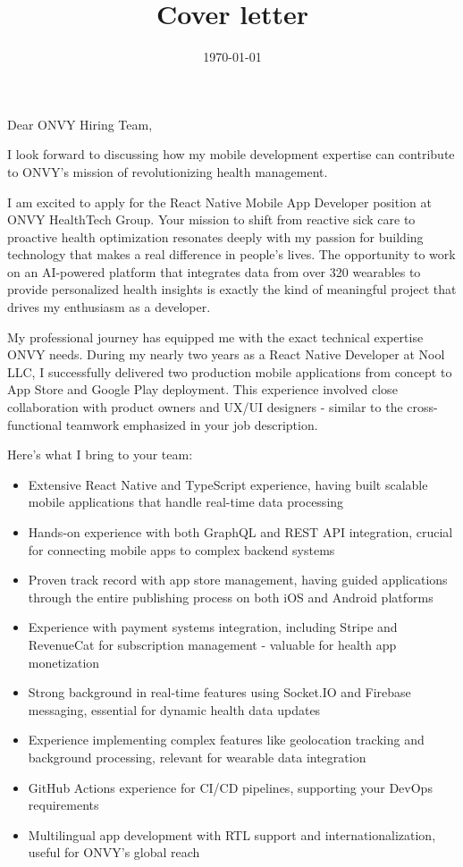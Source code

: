 \documentclass[11pt,a4paper,roman]{moderncv}        %
\title{Cover letter}
\begin{document}
\date{\today}
\opening{Dear ONVY Hiring Team,}
\closing{I look forward to discussing how my mobile development expertise can contribute to ONVY's mission of revolutionizing health management.}

\makelettertitle

I am excited to apply for the React Native Mobile App Developer position at ONVY HealthTech Group. Your mission to shift from reactive sick care to proactive health optimization resonates deeply with my passion for building technology that makes a real difference in people's lives. The opportunity to work on an AI-powered platform that integrates data from over 320 wearables to provide personalized health insights is exactly the kind of meaningful project that drives my enthusiasm as a developer.

My professional journey has equipped me with the exact technical expertise ONVY needs. During my nearly two years as a React Native Developer at Nool LLC, I successfully delivered two production mobile applications from concept to App Store and Google Play deployment. This experience involved close collaboration with product owners and UX/UI designers - similar to the cross-functional teamwork emphasized in your job description.

Here's what I bring to your team:

\begin{itemize}
\item Extensive React Native and TypeScript experience, having built scalable mobile applications that handle real-time data processing
\item Hands-on experience with both GraphQL and REST API integration, crucial for connecting mobile apps to complex backend systems
\item Proven track record with app store management, having guided applications through the entire publishing process on both iOS and Android platforms
\item Experience with payment systems integration, including Stripe and RevenueCat for subscription management - valuable for health app monetization
\item Strong background in real-time features using Socket.IO and Firebase messaging, essential for dynamic health data updates
\item Experience implementing complex features like geolocation tracking and background processing, relevant for wearable data integration
\item GitHub Actions experience for CI/CD pipelines, supporting your DevOps requirements
\item Multilingual app development with RTL support and internationalization, useful for ONVY's global reach
\end{itemize}
\end{document}
